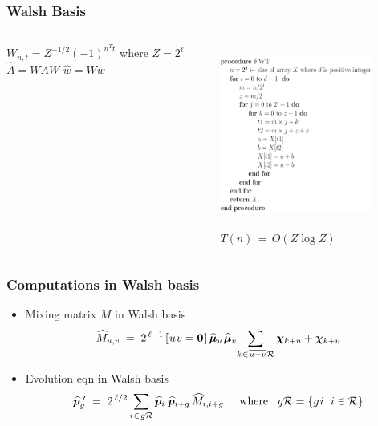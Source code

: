 \documentclass[aspectratio=169]{beamer}
\newcommand{\nudge}{\hspace{0.01in}}
\begin{document}
  \begin{frame}
    \frametitle{Walsh Basis}    
    \begin{columns}
	
	 $W_{n,t} = Z^{-1/2} (-1)^{n^T t}$ where $Z = 2^\ell$
	 \newline
	$\widehat{A} = WAW$
	\newline
	$\widehat{w} = Ww$        
	
	  \includegraphics[height=6cm, width=5cm]{figures/eps/fwt.eps}      
	  \newline $T(n) \,=\, O(Z \log Z)$
    \end{columns}    
  \end{frame}
    
  \begin{frame}
    \frametitle{Computations in Walsh basis}
    \begin{itemize}
	\item{Mixing matrix $M$ in Walsh basis 
	\[
	  \widehat{M}_{u,v} \; = \; 2^{\,\ell-1} \,[\nudge u \nudge v = {\bf
	  0}\nudge]\, \widehat{\bm{\mu}}_u \nudge \widehat{\bm{\mu}}_v \!  \sum_{k
	\nudge \in \nudge \overline{u+v} \nudge \mathcal{R}} \bm{\chi}_{k + u} +
	\bm{\chi}_{k + v}
	\]
	}
	\item{Evolution eqn in Walsh basis 
	\[
	  \widehat{\bm{p}}_g^{\,\,\prime} \; = \; 2^{\,\ell/2} \sum_{i \nudge \in \nudge g \mathcal{R}}
	  \widehat{\bm{p}}_i \, \nudge \widehat{\bm{p}}_{i+g} \,\widehat{M}_{i,i+g} 
	  \;\;\;\;\; \mbox{where} \;\;\; g \mathcal{R} = \{g \nudge i \, | \, i \in \mathcal{R} \}
	 \]	 
	}
    \end{itemize}
    
  \end{frame}
  
\end{document}
